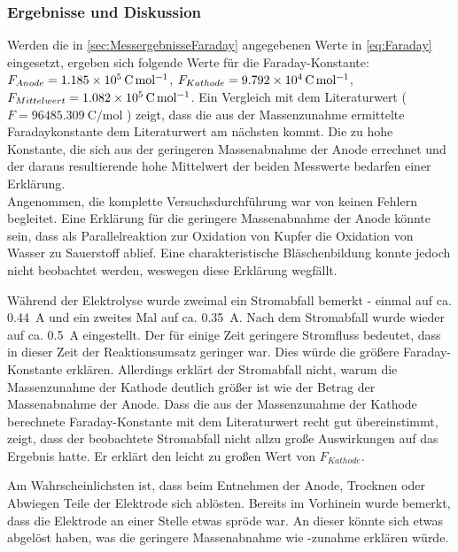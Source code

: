 \documentclass{article}
\begin{document}
      \subsubsection{Ergebnisse und Diskussion} \label{sec:ErgebnisseFaraday}
      
        Werden die in \ref{sec:MessergebnisseFaraday} angegebenen Werte in \eqref{eq:Faraday} eingesetzt, ergeben sich folgende Werte für die Faraday-Konstante: $F_{Anode} = \SI[mode=text]{1.185d5}{\coulomb\per\mole}$, $F_{Kathode} = \SI[mode=text]{9.792d4}{\coulomb\per\mole}$, $F_{Mittelwert} = \SI[mode=text]{1.082d5}{\coulomb\per\mole}$. Ein Vergleich mit dem Literaturwert ($F = \SI[mode=text]{96485.309}{\coulomb\per\mole}$ \cite{Faraday}) zeigt, dass die aus der Massenzunahme ermittelte Faradaykonstante dem Literaturwert am nächsten kommt. Die zu hohe Konstante, die sich aus der geringeren Massenabnahme der Anode errechnet und der daraus resultierende hohe Mittelwert der beiden Messwerte bedarfen einer Erklärung. \\
        
        Angenommen, die komplette Versuchsdurchführung war von keinen Fehlern begleitet. Eine Erklärung für die geringere Massenabnahme der Anode könnte sein, dass als Parallelreaktion zur Oxidation von Kupfer die Oxidation von Wasser zu Sauerstoff ablief. Eine charakteristische Bläschenbildung konnte jedoch nicht beobachtet werden, weswegen diese Erklärung wegfällt. 
        
        Während der Elektrolyse wurde zweimal ein Stromabfall bemerkt - einmal auf ca. \SI[mode=text]{0.44}{\ampere} und ein zweites Mal auf ca. \SI[mode=text]{0.35}{\ampere}. Nach dem Stromabfall wurde wieder auf ca. \SI[mode=text]{0.5}{\ampere} eingestellt. Der für einige Zeit geringere Stromfluss bedeutet, dass in dieser Zeit der Reaktionsumsatz geringer war. Dies würde die größere Faraday-Konstante erklären. Allerdings erklärt der Stromabfall nicht, warum die Massenzunahme der Kathode deutlich größer ist wie der Betrag der Massenabnahme der Anode. Dass die aus der Massenzunahme der Kathode berechnete Faraday-Konstante mit dem Literaturwert recht gut übereinstimmt, zeigt, dass der beobachtete Stromabfall nicht allzu große Auswirkungen auf das Ergebnis hatte. Er erklärt den leicht zu großen Wert von $F_{Kathode}$.
        
        Am Wahrscheinlichsten ist, dass beim Entnehmen der Anode, Trocknen oder Abwiegen Teile der Elektrode sich ablösten. Bereits im Vorhinein wurde bemerkt, dass die Elektrode an einer Stelle etwas spröde war. An dieser könnte sich etwas abgelöst haben, was die geringere Massenabnahme wie -zunahme erklären würde.\\
        
\end{document}
